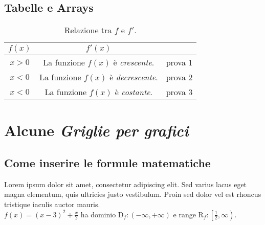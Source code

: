 \documentclass[11pt]{article}
\begin{document}
	\subsection{Tabelle e Arrays}
	\begin{table}[H]
	\caption{Relazione tra $f$ e $f'$.}
	\def\arraystretch{1.5}
	\begin{tabular}{c|c|r} %

	{$f(x)$} & {$f'(x)$}\\ \hline
	$x>0$ & La funzione $f(x)$ è \emph{crescente}. & prova 1\\
	\hline
	$x<0$ & La funzione $f(x)$ è \emph{decrescente}. & prova 2\\
	\hline	
	$x<0$ & La funzione $f(x)$ è \emph{costante}. & prova 3\\	
	\end{tabular}
		
	\end{table}

\section{Alcune \emph {Griglie per grafici}}
\subsection{Come inserire le formule matematiche}
Lorem ipsum dolor sit amet, consectetur adipiscing elit. Sed varius lacus eget magna elementum, quis ultricies justo vestibulum. Proin sed dolor vel est rhoncus tristique iaculis auctor mauris.\\[3mm]
$f(x)=(x-3)^2+ \displaystyle \frac{x}{2}$ ha dominio $\mathrm{D}_f:(-\infty,+\infty)$
e range $\mathrm{R}_f:\left[\frac{1}{2},\infty\right)$.\\
\end{document}
